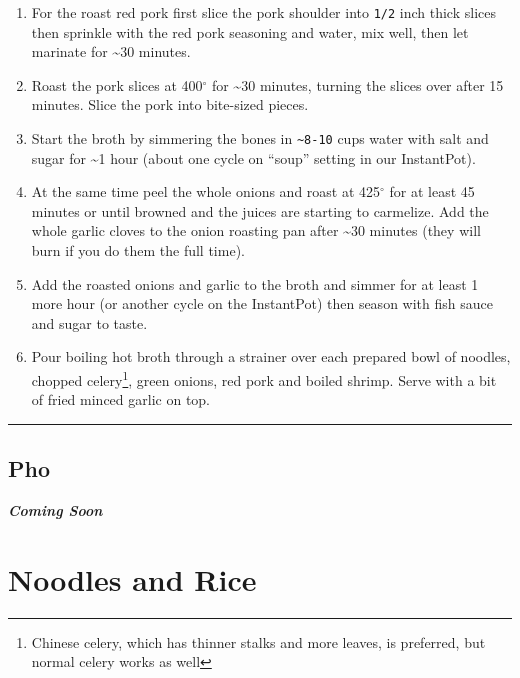 \documentclass[
]{book}
\begin{document}
\begin{enumerate}
\def\labelenumi{\arabic{enumi}.}
\item
  For the roast red pork first slice the pork shoulder into \texttt{1/2} inch thick slices then sprinkle with the red pork seasoning and water, mix well, then let marinate for \textasciitilde30 minutes.
\item
  Roast the pork slices at 400\(^\circ\) for \textasciitilde30 minutes, turning the slices over after 15 minutes. Slice the pork into bite-sized pieces.
\item
  Start the broth by simmering the bones in \texttt{\textasciitilde{}8-10} cups water with salt and sugar for \textasciitilde1 hour (about one cycle on ``soup'' setting in our InstantPot).
\item
  At the same time peel the whole onions and roast at 425\(^\circ\) for at least 45 minutes or until browned and the juices are starting to carmelize. Add the whole garlic cloves to the onion roasting pan after \textasciitilde30 minutes (they will burn if you do them the full time).
\item
  Add the roasted onions and garlic to the broth and simmer for at least 1 more hour (or another cycle on the InstantPot) then season with fish sauce and sugar to taste.
\item
  Pour boiling hot broth through a strainer over each prepared bowl of noodles, chopped celery\footnote{Chinese celery, which has thinner stalks and more leaves, is preferred, but normal celery works as well}, green onions, red pork and boiled shrimp. Serve with a bit of fried minced garlic on top.
\end{enumerate}

\begin{center}\rule{0.5\linewidth}{0.5pt}\end{center}

\hypertarget{pho}{%
\subsection*{Pho}\label{pho}}

\textbf{\emph{Coming Soon}}

\hypertarget{noodles-and-rice}{%
\section*{Noodles and Rice}\label{noodles-and-rice}}
\end{document}
